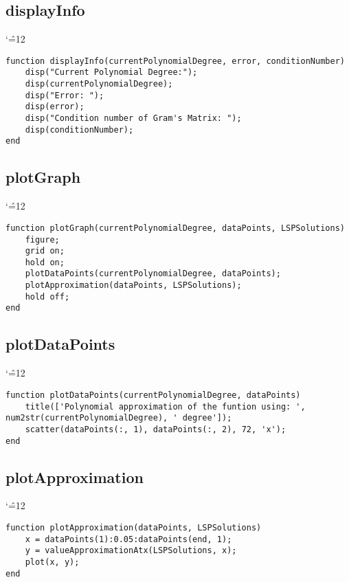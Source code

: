 \documentclass[12pt]{report}
\newenvironment{simplechar}{%
   \catcode`\^=12
}{}
\begin{document}
\subsection{displayInfo}
\begin{simplechar}
\begin{lstlisting}
function displayInfo(currentPolynomialDegree, error, conditionNumber)
    disp("Current Polynomial Degree:");
    disp(currentPolynomialDegree);
    disp("Error: ");
    disp(error);
    disp("Condition number of Gram's Matrix: ");
    disp(conditionNumber);
end
\end{lstlisting}
\end{simplechar}

\subsection{plotGraph}
\begin{simplechar}
\begin{lstlisting}
function plotGraph(currentPolynomialDegree, dataPoints, LSPSolutions)
    figure;
    grid on;
    hold on;
    plotDataPoints(currentPolynomialDegree, dataPoints);
    plotApproximation(dataPoints, LSPSolutions);
    hold off;
end
\end{lstlisting}
\end{simplechar}

\subsection{plotDataPoints}
\begin{simplechar}
\begin{lstlisting}
function plotDataPoints(currentPolynomialDegree, dataPoints)
    title(['Polynomial approximation of the funtion using: ', num2str(currentPolynomialDegree), ' degree']);
    scatter(dataPoints(:, 1), dataPoints(:, 2), 72, 'x');
end
\end{lstlisting}
\end{simplechar}

\subsection{plotApproximation}
\begin{simplechar}
\begin{lstlisting}
function plotApproximation(dataPoints, LSPSolutions)
    x = dataPoints(1):0.05:dataPoints(end, 1);
    y = valueApproximationAtx(LSPSolutions, x);
    plot(x, y);
end

\end{lstlisting}
\end{simplechar}
\end{document}
